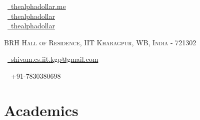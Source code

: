\documentclass[a4paper,10pt]{extarticle} %
\begin{document}
\pagestyle{empty} %


\begin{multicols}{3}
\normalsize  \faGlobe\ {\href{https://thealphadollar.me/}{\  thealphadollar.me}}\\
\normalsize \faGithub\ {\href{https://github.com/thealphadollar}{\  thealphadollar}}\\
\normalsize  \faLinkedinSquare\ {\href{https://www.linkedin.com/in/thealphadollar}{\  thealphadollar}}\\
\columnbreak
\normalsize\par{\centering{\huge\textsc{\textcolor{primary}{Shivam Kumar Jha}}}\par} %
\par{\centering\normalsize {\textsc{BRH Hall of Residence, IIT Kharagpur, WB, India - 721302}}\hfill\par}
\columnbreak
\raggedright\hfill\normalsize \faEnvelope\ {\href{mailto:shivam.cs.iit.kgp@gmail.com}{\  shivam.cs.iit.kgp@gmail.com}}\\
\raggedright\hfill{\faPhone\ \  +91-7830380698}
\end{multicols}


\vspace{-0.6cm}
\section{\textcolor{primary}{Academics}}
\end{document}

